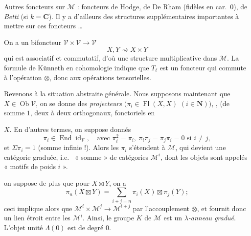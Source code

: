 \documentclass[11pt,a4paper]{article}
\begin{document}
Autres foncteurs   sur
$\mathcal{M}$ : foncteurs de Hodge, de  De Rham (fidèles
en car.\ 0), de \emph{Betti} (si $k = \mathbf{C}$). Il y a d'ailleurs des structures
supplémentaires importantes à mettre sur ces foncteurs …

On a un bifoncteur $\mathcal{V} \times \mathcal{V} \to \mathcal{V}$
\[
  X, Y \rightsquigarrow X \times Y
\]
\struck{\ill{}} qui est associatif et commutatif, d'où une structure
multiplicative dans $\mathcal{M}$. La formule de Künneth en cohomologie
indique que $T_{\ell}$ est un foncteur qui commute  à
l'opération $\otimes$, donc aux opérations tensorielles.


Revenons à la situation abstraite générale. Nous supposons maintenant que
 $X \in \operatorname{Ob}\mathcal{V}$, on se donne des
\emph{projecteurs} $(\pi_{i} \in \operatorname{Fl}(X,X)$ $(i \in \mathbf{N}))$,
,
(de somme $1$, deux à deux orthogonaux, fonctoriels en

$X$. En d'autres termes, on suppose donnés  
\[
  \pi_{i} \in \operatorname{End}\operatorname{id}_{\mathcal{V}}, \quad
  \text{avec } \pi_{i}^{2} = \pi_{i},\ \pi_{i}\pi_{j} = \pi_{j}\pi_{i} = 0
  \text{ si } i \neq j,
\]
et $\Sigma\pi_{i} = 1$ (somme infinie !). Alors les $\pi_{i}$ s'étendent
à $\mathcal{M}$, qui devient une catégorie graduée, i.e.\ 
« somme » de catégories $\mathcal{M}^{i}$, dont les objets sont appelés
« motifs  de poids $i$ ».

 on suppose de plus que \struck{\ill{}} pour $X \boxtimes Y$, on a
\[
  \pi_{n}(X \boxtimes Y) = \sum_{i+j=n} \pi_{i}(X) \boxtimes \pi_{j}(Y) ;
\]
ceci implique alors que $\mathcal{M}^{i} \times \mathcal{M}^{j} \to
\mathcal{M}^{i+j}$ par l'accouplement $\otimes$, et fournit donc un lien
étroit entre les $\mathcal{M}^{i}$. Ainsi, le groupe  $K$ de $\mathcal{M}$ est un \emph{$\lambda$-anneau gradué}.
L'objet unité $\Lambda(0)$ est de degré $0$.
\end{document}
